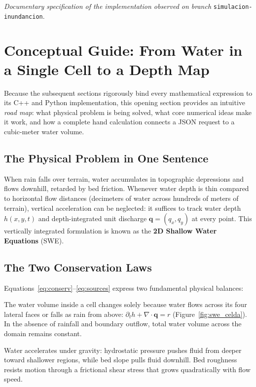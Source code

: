 \documentclass[11pt,a4paper]{article}
\begin{document}
\noindent\emph{Documentary specification of the implementation observed on branch} \texttt{simulacion-inundancion}.


\section{Conceptual Guide: From Water in a Single Cell to a Depth Map}
\label{sec:guia-inundacion}

Because the subsequent sections rigorously bind every mathematical expression to its C++ and Python implementation, this opening section provides an intuitive \emph{road map}: what physical problem is being solved, what core numerical ideas make it work, and how a complete hand calculation connects a JSON request to a cubic-meter water volume.

\subsection{The Physical Problem in One Sentence}

When rain falls over terrain, water accumulates in topographic depressions and flows downhill, retarded by bed friction. Whenever water depth is thin compared to horizontal flow distances (decimeters of water across hundreds of meters of terrain), vertical acceleration can be neglected: it suffices to track water depth $h(x,y,t)$ and depth-integrated unit discharge $\mathbf q=(q_x,q_y)$ at every point. This vertically integrated formulation is known as the \textbf{2D Shallow Water Equations} (SWE).

\subsection{The Two Conservation Laws}

Equations~\eqref{eq:conserv}--\eqref{eq:sources} express two fundamental physical balances:
\begin{description}[style=nextline]
  \item[Conservation of Mass (Continuity, first component).] The water volume inside a cell changes solely because water flows across its four lateral faces or falls as rain from above: $\partial_t h+\nabla\!\cdot\!\mathbf q=r$ (Figure~\ref{fig:swe_celda}). In the absence of rainfall and boundary outflow, total water volume across the domain remains constant.
  \item[Conservation of Momentum (second and third components).] Water accelerates under gravity: hydrostatic pressure pushes fluid from deeper toward shallower regions, while bed slope pulls fluid downhill. Bed roughness resists motion through a frictional shear stress that grows quadratically with flow speed.
\end{description}
\end{document}
